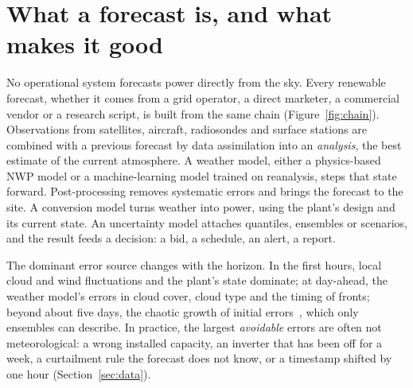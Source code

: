 \section{What a forecast is, and what makes it good}
\label{sec:chain}

 No operational system forecasts power directly from the sky. Every renewable forecast, whether it comes from a grid operator, a direct marketer, a commercial vendor or a research script, is built from the same chain (Figure~\ref{fig:chain}). Observations from satellites, aircraft, radiosondes and surface stations are combined with a previous forecast by data assimilation into an \emph{analysis}, the best estimate of the current atmosphere. A weather model, either a physics-based NWP model or a machine-learning model trained on reanalysis, steps that state forward. Post-processing removes systematic errors and brings the forecast to the site. A conversion model turns weather into power, using the plant's design and its current state. An uncertainty model attaches quantiles, ensembles or scenarios, and the result feeds a decision: a bid, a schedule, an alert, a report.



 The dominant error source changes with the horizon. In the first hours, local cloud and wind fluctuations and the plant's state dominate; at day-ahead, the weather model's errors in cloud cover, cloud type and the timing of fronts; beyond about five days, the chaotic growth of initial errors~\cite{lorenz1963deterministic}, which only ensembles can describe. In practice, the largest \emph{avoidable} errors are often not meteorological: a wrong installed capacity, an inverter that has been off for a week, a curtailment rule the forecast does not know, or a timestamp shifted by one hour (Section~\ref{sec:data}).

